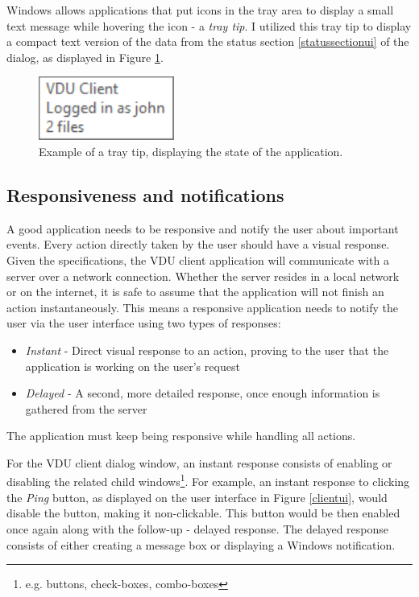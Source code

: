 Windows allows applications that put icons in the tray area to display a small text message while hovering the icon - a \textit{tray tip}. I utilized this tray tip to display a compact text version of the data from the status section \ref{statussectionui} of the dialog, as displayed in Figure \ref{traytipex}.

\begin{figure}[H]
    \centering
	\includegraphics[]{obrazky-figures/traytip.pdf}
	\caption{Example of a tray tip, displaying the state of the application.}
	\label{traytipex}
\end{figure}

\subsection{Responsiveness and notifications}
A good application needs to be responsive and notify the user about important events. Every action directly taken by the user should have a visual response. Given the specifications, the VDU client application will communicate with a server over a network connection. Whether the server resides in a local network or on the internet, it is safe to assume that the application will not finish an action instantaneously. This means a responsive application needs to notify the user via the user interface using two types of responses:
\begin{itemize}
    \item \textit{Instant} - Direct visual response to an action, proving to the user that the application is working on the user's request
    \item \textit{Delayed} - A second, more detailed response, once enough information is gathered from the server
\end{itemize}
The application must keep being responsive while handling all actions.

For the VDU client dialog window, an instant response consists of enabling or disabling the related child windows\footnote{e.g. buttons, check-boxes, combo-boxes}. For example, an instant response to clicking the \textit{Ping} button, as displayed on the user interface in Figure \ref{clientui}, would disable the button, making it non-clickable. This button would be then enabled once again along with the follow-up - delayed response.
The delayed response consists of either creating a message box or displaying a Windows notification.


